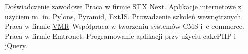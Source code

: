 \begin{rubric}{Doświadczenie zawodowe}
Praca w firmie STX Next. Aplikacje internetowe z
użyciem m. in. Pylons, Pyramid, ExtJS. Prowadzenie szkoleń wewnętrznych.
Praca w firmie \href{http://vmr.pl/}{VMR} 
Współpraca w tworzeniu systemów CMS i~\hbox{e-commerce}.
Praca w firmie Emtronet. Programowanie
aplikacji przy użyciu cakePHP i jQuery.
\end{rubric}
